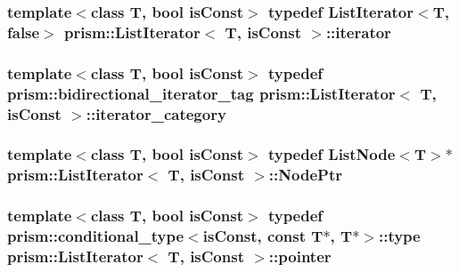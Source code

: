\subsubsection[{\texorpdfstring{iterator}{iterator}}]{\setlength{\rightskip}{0pt plus 5cm}template$<$class T, bool is\+Const$>$ typedef {\bf List\+Iterator}$<$T, false$>$ {\bf prism\+::\+List\+Iterator}$<$ T, is\+Const $>$\+::{\bf iterator}}\hypertarget{structprism_1_1_list_iterator_a91ccdd8512cbc8314d784e39ed4597dd}{}\label{structprism_1_1_list_iterator_a91ccdd8512cbc8314d784e39ed4597dd}
\subsubsection[{\texorpdfstring{iterator\+\_\+category}{iterator_category}}]{\setlength{\rightskip}{0pt plus 5cm}template$<$class T, bool is\+Const$>$ typedef {\bf prism\+::bidirectional\+\_\+iterator\+\_\+tag} {\bf prism\+::\+List\+Iterator}$<$ T, is\+Const $>$\+::{\bf iterator\+\_\+category}}\hypertarget{structprism_1_1_list_iterator_ae5286e35b86909c6990d328423bf3641}{}\label{structprism_1_1_list_iterator_ae5286e35b86909c6990d328423bf3641}
\subsubsection[{\texorpdfstring{Node\+Ptr}{NodePtr}}]{\setlength{\rightskip}{0pt plus 5cm}template$<$class T, bool is\+Const$>$ typedef {\bf List\+Node}$<$T$>$$\ast$ {\bf prism\+::\+List\+Iterator}$<$ T, is\+Const $>$\+::{\bf Node\+Ptr}}\hypertarget{structprism_1_1_list_iterator_aad2175a44d3db4fd84059ae15158b174}{}\label{structprism_1_1_list_iterator_aad2175a44d3db4fd84059ae15158b174}
\subsubsection[{\texorpdfstring{pointer}{pointer}}]{\setlength{\rightskip}{0pt plus 5cm}template$<$class T, bool is\+Const$>$ typedef {\bf prism\+::conditional\+\_\+type}$<$is\+Const, const T$\ast$, T$\ast$$>$\+::type {\bf prism\+::\+List\+Iterator}$<$ T, is\+Const $>$\+::{\bf pointer}}\hypertarget{structprism_1_1_list_iterator_adb94db3cc26f2df6b6962b756b6fa3c3}{}\label{structprism_1_1_list_iterator_adb94db3cc26f2df6b6962b756b6fa3c3}
